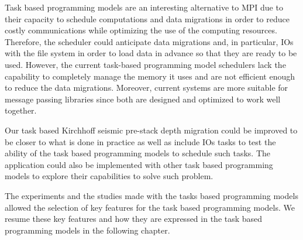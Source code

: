 Task based programming models are an interesting alternative to MPI due to their capacity to schedule computations and data migrations in order to reduce costly communications while optimizing the use of the computing resources.
Therefore, the scheduler could anticipate data migrations and, in particular, IOs with the file system in order to load data in advance so that they are ready to be used.
However, the current task-based programming model schedulers lack the capability to completely manage the memory it uses and are not efficient enough to reduce the data migrations.
Moreover, current systems are more suitable for message passing libraries since both are designed and optimized to work well together.

Our task based Kirchhoff seismic pre-stack depth migration could be improved to be closer to what is done in practice as well as include IOs tasks to test the ability of the task based programming models to schedule such tasks.
The application could also be implemented with other task based programming models to explore their capabilities to solve such problem.

The experiments and the studies made with the tasks based programming models allowed the selection of key features for the task based programming models.
We resume these key features and how they are expressed in the task based programming models in the following chapter.